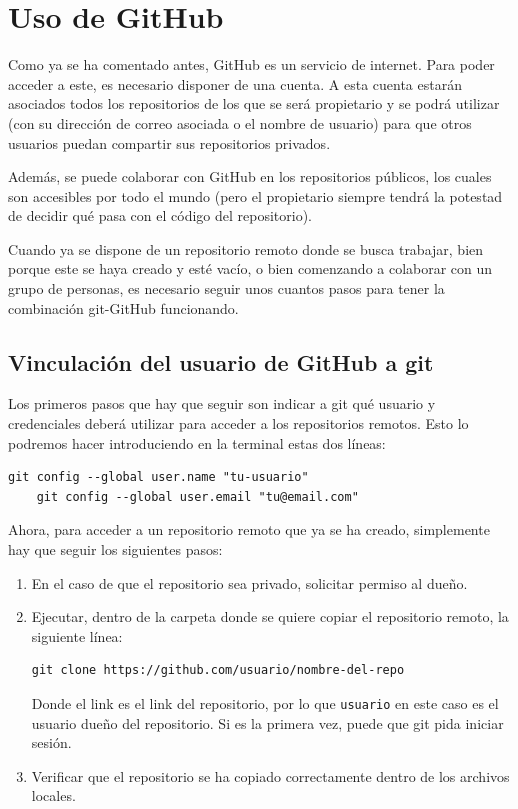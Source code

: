 \documentclass[
twoside,
12pt,                   
]{article}
\begin{document}
\section{Uso de GitHub}
Como ya se ha comentado antes, GitHub es un servicio de internet. Para poder acceder a este, es necesario disponer de una cuenta. A esta cuenta estarán asociados todos los repositorios de los que se será propietario y se podrá utilizar (con su dirección de correo asociada o el nombre de usuario) para que otros usuarios puedan compartir sus repositorios privados.
\par Además, se puede colaborar con GitHub en los repositorios públicos, los cuales son accesibles por todo el mundo (pero el propietario siempre tendrá la potestad de decidir qué pasa con el código del repositorio). 
\par Cuando ya se dispone de un repositorio remoto donde se busca trabajar, bien porque este se haya creado y esté vacío, o bien comenzando a colaborar con un grupo de personas, es necesario seguir unos cuantos pasos para tener la combinación git-GitHub funcionando.

\subsection{Vinculación del usuario de GitHub a git}
Los primeros pasos que hay que seguir son indicar a git qué usuario y credenciales deberá utilizar para acceder a los repositorios remotos. Esto lo podremos hacer introduciendo en la terminal estas dos líneas:
\begin{lstlisting}[style=powershell]
    git config --global user.name "tu-usuario"
    git config --global user.email "tu@email.com"
\end{lstlisting}

Ahora, para acceder a un repositorio remoto que ya se ha creado, simplemente hay que seguir los siguientes pasos:
\begin{enumerate}
    \item En el caso de que el repositorio sea privado, solicitar permiso al dueño.
    \item Ejecutar, dentro de la carpeta donde se quiere copiar el repositorio remoto, la siguiente línea:
\begin{lstlisting}[style=powershell]
git clone https://github.com/usuario/nombre-del-repo
\end{lstlisting}
    Donde el link es el link del repositorio, por lo que \texttt{usuario} en este caso es el usuario dueño del repositorio. Si es la primera vez, puede que git pida iniciar sesión.
    \item Verificar que el repositorio se ha copiado correctamente dentro de los archivos locales.
\end{enumerate}
\end{document}
